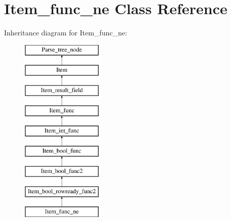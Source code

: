 \hypertarget{classItem__func__ne}{}\section{Item\+\_\+func\+\_\+ne Class Reference}
\label{classItem__func__ne}
Inheritance diagram for Item\+\_\+func\+\_\+ne\+:\begin{figure}[H]
\begin{center}
\leavevmode
\includegraphics[height=9.000000cm]{classItem__func__ne}
\end{center}
\end{figure}
